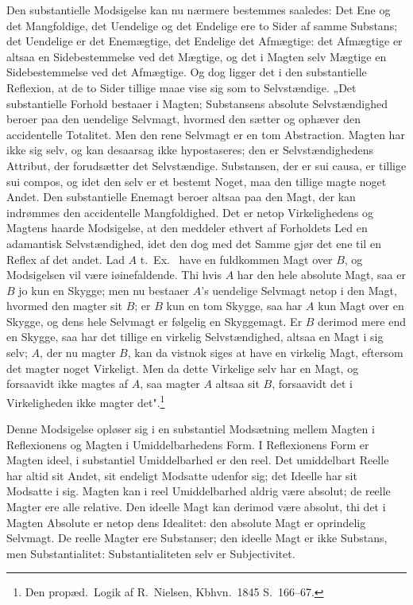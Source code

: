 \documentclass[12pt]{book}
\newcommand{\opage}[1]{\marginnote{\footnotesize\textit{[#1]}}}
\begin{document}
Den substantielle Modsigelse kan nu nærmere bestemmes saaledes: Det Ene og det
Mangfoldige, det Uendelige og det Endelige ere to Sider af samme Substans; det
Uendelige er det Enemægtige, det Endelige det Afmægtige: det Afmægtige er altsaa en
Sidebestemmelse ved det Mægtige, og det i Magten selv Mægtige en Sidebestemmelse ved
det Afmægtige. Og dog ligger det i den substantielle Reflexion, at de to Sider tillige
maae vise sig som to Selvstændige. „Det substantielle Forhold bestaaer i Magten;
Substansens absolute Selvstændighed beroer paa den uendelige Selvmagt, hvormed den
sætter og ophæver den accidentelle Totalitet. Men den rene Selvmagt er en tom
Abstraction. Magten har ikke sig selv, og kan desaarsag ikke hypostaseres; den er
Selvstændighedens Attribut, der forudsætter det Selvstændige. Substansen, der er sui
causa, er tillige sui compos, og idet den selv er et bestemt Noget, maa den tillige
magte noget Andet. Den substantielle Enemagt beroer altsaa paa den Magt, der kan
indrømmes den accidentelle Mangfoldighed. Det er netop Virkelighedens og Magtens haarde
Modsigelse, at den meddeler ethvert af Forholdets Led en adamantisk Selvstændighed,
idet den dog med det Samme gjør det ene til en Reflex af det andet. Lad $A$ t.\ Ex.\
have en fuldkommen Magt over $B$, og Modsigelsen vil være iøinefaldende. Thi hvis $A$
har den hele absolute Magt, saa er $B$ jo kun en Skygge; men nu bestaaer $A$'s uendelige
Selvmagt netop i den Magt, hvormed den magter sit $B$; er $B$ kun en tom Skygge, saa har
$A$ kun Magt over en Skygge, og dens hele Selvmagt er følgelig en Skyggemagt. Er $B$
\opage{113} derimod mere end en Skygge, saa har det tillige en virkelig Selvstændighed, altsaa en
Magt i sig selv; $A$, der nu magter $B$, kan da vistnok siges at have en virkelig Magt,
eftersom det magter noget Virkeligt. Men da dette Virkelige selv har en Magt, og
forsaavidt ikke magtes af $A$, saa magter $A$ altsaa sit $B$, forsaavidt det i
Virkeligheden ikke magter det".\footnote{Den propæd.\ Logik af R.\ Nielsen, Kbhvn.\ 1845
S.~166--67.}

Denne Modsigelse opløser sig i en substantiel Modsætning mellem Magten i Reflexionens og
Magten i Umiddelbarhedens Form. I Reflexionens Form er Magten ideel, i substantiel
Umiddelbarhed er den reel. Det umiddelbart Reelle har altid sit Andet, sit endeligt
Modsatte udenfor sig; det Ideelle har sit Modsatte i sig. Magten kan i reel
Umiddelbarhed aldrig være absolut; de reelle Magter ere alle relative. Den ideelle Magt
kan derimod være absolut, thi det i Magten Absolute er netop dens Idealitet: den absolute
Magt er oprindelig Selvmagt. De reelle Magter ere Substanser; den ideelle Magt er ikke
Substans, men Substantialitet: Substantialiteten selv er Subjectivitet.
\end{document}
